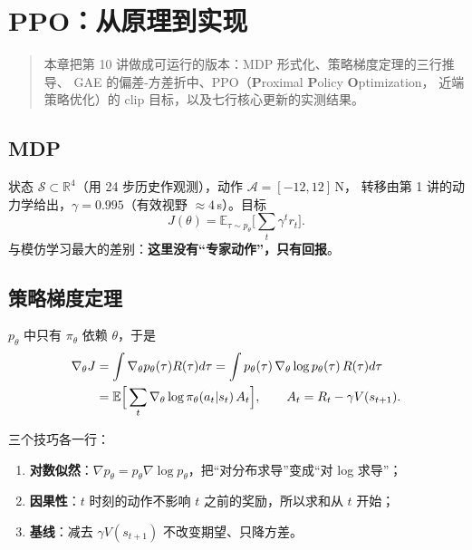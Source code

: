 \chapter{PPO：从原理到实现}
\label{ch:ppo-impl}

\begin{quote}\small
本章把第 10 讲做成可运行的版本：MDP 形式化、策略梯度定理的三行推导、
GAE 的偏差-方差折中、PPO（\textbf{P}roximal \textbf{P}olicy \textbf{O}ptimization，
近端策略优化）的 clip 目标，以及七行核心更新的实测结果。
\end{quote}

\section{MDP}

状态 $\mathcal{S}\subset\mathbb{R}^4$（用 24 步历史作观测），动作 $\mathcal{A}=[-12,12]$\,N，
转移由第 1 讲的动力学给出，$\gamma=0.995$（有效视野 $\approx4$\,s）。目标
\begin{equation}
  J(\theta)=\mathbb{E}_{\tau\sim p_\theta}\Big[\sum_{t}\gamma^t r_t\Big].
\end{equation}
与模仿学习最大的差别：\textbf{这里没有“专家动作”，只有回报}。

\section{策略梯度定理}

$p_\theta$ 中只有 $\pi_\theta$ 依赖 $\theta$，于是
\begin{align}
  \nabla_\theta J
  &=\int \nabla_\theta p_\theta(\tau)R(\tau)d\tau
   =\int p_\theta(\tau)\,\nabla_\theta\log p_\theta(\tau)\,R(\tau)d\tau \notag\\
  &=\mathbb{E}\Big[\sum_t\nabla_\theta\log\pi_\theta(a_t|s_t)\,A_t\Big],
  \qquad A_t=R_t-\gamma V(s_{t+1}).
\end{align}

三个技巧各一行：
\begin{enumerate}[leftmargin=1.6em,itemsep=2pt]
  \item \textbf{对数似然}：$\nabla p_\theta=p_\theta\nabla\log p_\theta$，把“对分布求导”变成“对 log 求导”；
  \item \textbf{因果性}：$t$ 时刻的动作不影响 $t$ 之前的奖励，所以求和从 $t$ 开始；
  \item \textbf{基线}：减去 $\gamma V(s_{t+1})$ 不改变期望、只降方差。
\end{enumerate}


